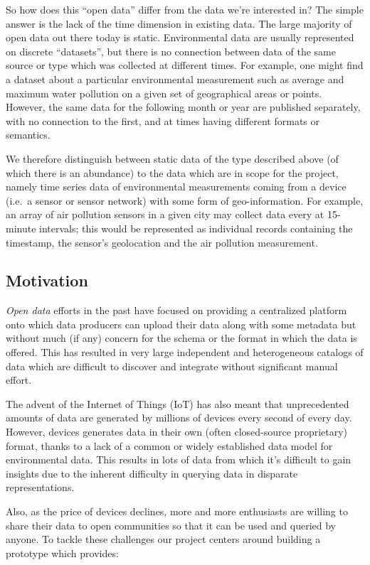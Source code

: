 So how does this ``open data'' differ from the data we're interested in?
The simple answer is the lack of the time dimension in existing data.
The large majority of open data out there today is static. Environmental
data are usually represented on discrete ``datasets'', but there is no
connection between data of the same source or type which was collected
at different times. For example, one might find a dataset about a
particular environmental measurement such as average and maximum water
pollution on a given set of geographical areas or points. However, the
same data for the following month or year are published separately, with
no connection to the first, and at times having different formats or
semantics.

We therefore distinguish between static data of the type described above
(of which there is an abundance) to the data which are in scope for the
project, namely time series data of environmental measurements coming
from a device (i.e.~a sensor or sensor network) with some form of
geo-information. For example, an array of air pollution sensors in a
given city may collect data every at 15-minute intervals; this would be
represented as individual records containing the timestamp, the sensor's
geolocation and the air pollution measurement.

\subsection{Motivation}\label{motivation}

\emph{Open data} efforts in the past have focused on providing a
centralized platform onto which data producers can upload their data
along with some metadata but without much (if any) concern for the
schema or the format in which the data is offered. This has resulted in
very large independent and heterogeneous catalogs of data which are
difficult to discover and integrate without significant manual effort.

The advent of the Internet of Things (IoT) has also meant that
unprecedented amounts of data are generated by millions of devices every
second of every day. However, devices generates data in their own (often
closed-source proprietary) format, thanks to a lack of a common or
widely established data model for environmental data. This results in
lots of data from which it's difficult to gain insights due to the
inherent difficulty in querying data in disparate representations.

Also, as the price of devices declines, more and more enthusiasts are
willing to share their data to open communities so that it can be used
and queried by anyone. To tackle these challenges our project centers
around building a prototype which provides:

